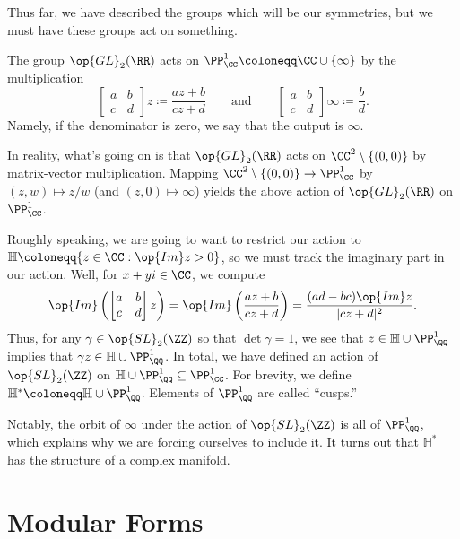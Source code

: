 \documentclass{amsart}
\begin{document}
Thus far, we have described the groups which will be our symmetries, but we must have these groups act on something.
\begin{definition}
	The group $\op{GL}_2(\RR)$ acts on $\PP^1_\CC\coloneqq\CC\cup\{\infty\}$ by the multiplication
	\[\begin{bmatrix}
		a & b \\
		c & d
	\end{bmatrix}z\coloneqq\frac{az+b}{cz+d}\qquad\text{and}\qquad\begin{bmatrix}
		a & b \\
		c & d
	\end{bmatrix}\infty\coloneqq\frac bd.\]
	Namely, if the denominator is zero, we say that the output is $\infty$.
\end{definition}
In reality, what's going on is that $\op{GL}_2(\RR)$ acts on $\CC^2\setminus\{(0,0)\}$ by matrix-vector multiplication. Mapping $\CC^2\setminus\{(0,0)\}\to\PP^1_\CC$ by $(z,w)\mapsto z/w$ (and $(z,0)\mapsto\infty$) yields the above action of $\op{GL}_2(\RR)$ on $\PP^1_\CC$.

Roughly speaking, we are going to want to restrict our action to $\mathbb H\coloneqq\{z\in\CC:\op{Im}z>0\}$, so we must track the imaginary part in our action. Well, for $x+yi\in\CC$, we compute
\[\op{Im}\left(\begin{bmatrix}
	a & b \\
	c & d
\end{bmatrix}z\right)=\op{Im}\left(\frac{az+b}{cz+d}\right)=\frac{(ad-bc)\op{Im}z}{|cz+d|^2}.\]
Thus, for any $\gamma\in\op{SL}_2(\ZZ)$ so that $\det\gamma=1$, we see that $z\in\mathbb H\cup\PP^1_\QQ$ implies that $\gamma z\in\mathbb H\cup\PP^1_\QQ$. In total, we have defined an action of $\op{SL}_2(\ZZ)$ on $\mathbb H\cup\PP^1_\QQ\subseteq\PP^1_\CC$. For brevity, we define $\mathbb H^*\coloneqq\mathbb H\cup\PP^1_\QQ$. Elements of $\PP^1_\QQ$ are called ``cusps.''
\begin{remark}
	Notably, the orbit of $\infty$ under the action of $\op{SL}_2(\ZZ)$ is all of $\PP^1_\QQ$, which explains why we are forcing ourselves to include it. It turns out that $\mathbb H^*$ has the structure of a complex manifold.
\end{remark}

\section{Modular Forms}
\end{document}
